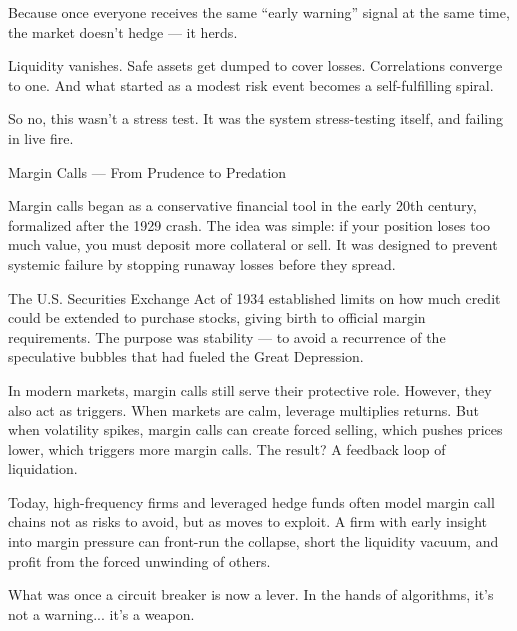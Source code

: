 Because once everyone receives the same “early warning” signal at the same time, the market doesn’t hedge — it herds.

Liquidity vanishes. Safe assets get dumped to cover losses. Correlations converge to one. And what started as a modest 
risk event becomes a self-fulfilling spiral.

So no, this wasn’t a stress test.
It was the system stress-testing itself, and failing in live fire.


\medskip

\begin{TechnicalSidebar}{Margin Calls --- From Prudence to Predation}

  Margin calls began as a conservative financial tool in the early 20th century, formalized after the 1929 crash. 
  The idea was simple: if your position loses too much value, you must deposit more collateral or sell. It was 
  designed to prevent systemic failure by stopping runaway losses before they spread.

  \medskip
  
  The U.S. Securities Exchange Act of 1934 established limits on how much credit could be extended to purchase 
  stocks, giving birth to official margin requirements. The purpose was stability — to avoid a recurrence of the 
  speculative bubbles that had fueled the Great Depression.

  \medskip
  
  In modern markets, margin calls still serve their protective role. However, they also act as triggers. When markets 
  are calm, leverage multiplies returns. But when volatility spikes, margin calls can create forced selling, which 
  pushes prices lower, which triggers more margin calls. The result? A feedback loop of liquidation.

  \medskip
  
  Today, high-frequency firms and leveraged hedge funds often model margin call chains not as risks to avoid, but 
  as moves to exploit. A firm with early insight into margin pressure can front-run the collapse, short the 
  liquidity vacuum, and profit from the forced unwinding of others.
  
  \medskip
  
  What was once a circuit breaker is now a lever. In the hands of algorithms, it’s not a warning... it’s a weapon.
  
\end{TechnicalSidebar}

